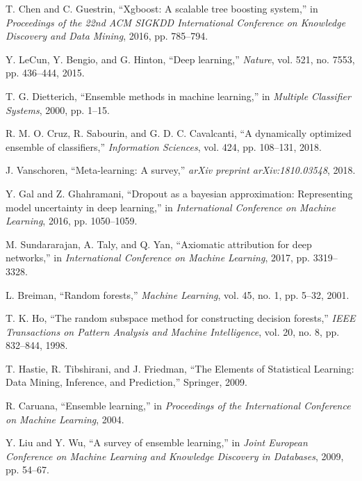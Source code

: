 \documentclass[10pt,journal,compsoc]{IEEEtran}
\begin{document}
\begin{thebibliography}{1}

T. Chen and C. Guestrin, ``Xgboost: A scalable tree boosting system,'' in \textit{Proceedings of the 22nd ACM SIGKDD International Conference on Knowledge Discovery and Data Mining}, 2016, pp. 785--794.

Y. LeCun, Y. Bengio, and G. Hinton, ``Deep learning,'' \textit{Nature}, vol. 521, no. 7553, pp. 436--444, 2015.

T. G. Dietterich, ``Ensemble methods in machine learning,'' in \textit{Multiple Classifier Systems}, 2000, pp. 1--15.

R. M. O. Cruz, R. Sabourin, and G. D. C. Cavalcanti, ``A dynamically optimized ensemble of classifiers,'' \textit{Information Sciences}, vol. 424, pp. 108--131, 2018.

J. Vanschoren, ``Meta-learning: A survey,'' \textit{arXiv preprint arXiv:1810.03548}, 2018.

Y. Gal and Z. Ghahramani, ``Dropout as a bayesian approximation: Representing model uncertainty in deep learning,'' in \textit{International Conference on Machine Learning}, 2016, pp. 1050--1059.

M. Sundararajan, A. Taly, and Q. Yan, ``Axiomatic attribution for deep networks,'' in \textit{International Conference on Machine Learning}, 2017, pp. 3319--3328.

L. Breiman, ``Random forests,'' \textit{Machine Learning}, vol. 45, no. 1, pp. 5--32, 2001.

T. K. Ho, ``The random subspace method for constructing decision forests,'' \textit{IEEE Transactions on Pattern Analysis and Machine Intelligence}, vol. 20, no. 8, pp. 832--844, 1998.

T. Hastie, R. Tibshirani, and J. Friedman, ``The Elements of Statistical Learning: Data Mining, Inference, and Prediction,'' Springer, 2009.

R. Caruana, ``Ensemble learning,'' in \textit{Proceedings of the International Conference on Machine Learning}, 2004.

Y. Liu and Y. Wu, ``A survey of ensemble learning,'' in \textit{Joint European Conference on Machine Learning and Knowledge Discovery in Databases}, 2009, pp. 54--67.


\end{thebibliography}
\end{document}
